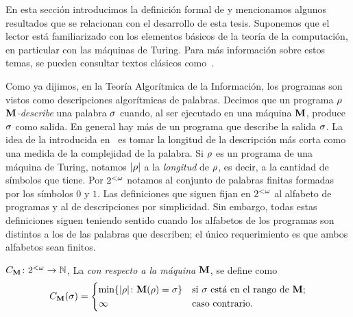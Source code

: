 
En esta sección introducimos la definición formal de \kolcomp y mencionamos algunos resultados que se relacionan con el desarrollo de esta tesis. Suponemos que el lector está familiarizado con los elementos básicos de la teoría de la computación, en particular con las máquinas de Turing. Para más información sobre estos temas, se pueden consultar textos clásicos como~\cite{O99,R87,S87}.

Como ya dijimos, en la Teoría Algorítmica de la Información, los programas son vistos como descripciones algorítmicas de palabras. Decimos que un programa $\rho$
{\em ${\bf M}$-describe} una palabra $\sigma$ cuando, al ser ejecutado en una máquina ${\bf M}$, produce $\sigma$ como salida. En general
hay más de un programa que describe la salida $\sigma$.
La idea de la \kolcomp introducida en~\cite{kolmogorov1965three,solomonoff1964formal,chaitin1975theory} es tomar la longitud de la descripción más corta como una medida de la complejidad de la palabra. Si $\rho$ es un programa de una máquina de Turing, notamos $| \rho |$ a la {\em longitud} de $\rho$, es decir, a la cantidad de símbolos que tiene. Por $2^{<\omega}$ notamos al conjunto de palabras finitas formadas por los símbolos $0$ y $1$. Las definiciones que siguen fijan en $2^{<\omega}$ al alfabeto de programas y al de descripciones por simplicidad. Sin embargo, todas estas definiciones siguen teniendo sentido cuando los alfabetos de los programas son distintos a los de las palabras que describen; el único requerimiento es que ambos alfabetos sean finitos.
%
\begin{definicion}[\kolcomp]\label{intro:def:plainC}
$C_{{\bf M}}\colon2^{<\omega} \to \mathbb{N}$, 
La {\em 
\kolcomp con respecto a la máquina ${\bf M}$}, se define como
$$
C_{{\bf M}}(\sigma)=
    \begin{cases}
    \min \{| \rho |\colon {\bf M}(\rho)=\sigma \} & \textrm{si $\sigma$ está en el rango de ${\bf M}$};\\
    \infty & \textrm{caso contrario.}
    \end{cases}
$$
\end{definicion}



